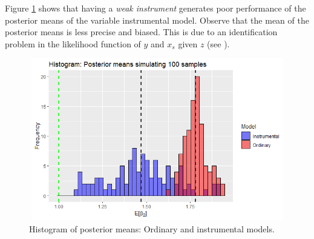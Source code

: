 \begin{enumerate}[leftmargin=*]
Figure \ref{fig71} shows that having a \textit{weak instrument} generates poor performance of the posterior means of the variable instrumental model. Observe that the mean of the posterior means is less precise and biased. This is due to an identification problem in the likelihood function of $y$ and $x_s$ given $z$ (see \cite[Chap.~7]{Rossi2005}).

\begin{figure}
	\includegraphics[width=340pt, height=200pt]{Chapters/chapter7/figures/Fig71.png}
	\caption[List of figure caption goes here]{Histogram of posterior means: Ordinary and instrumental models.}\label{fig71}
\end{figure}

\end{enumerate}